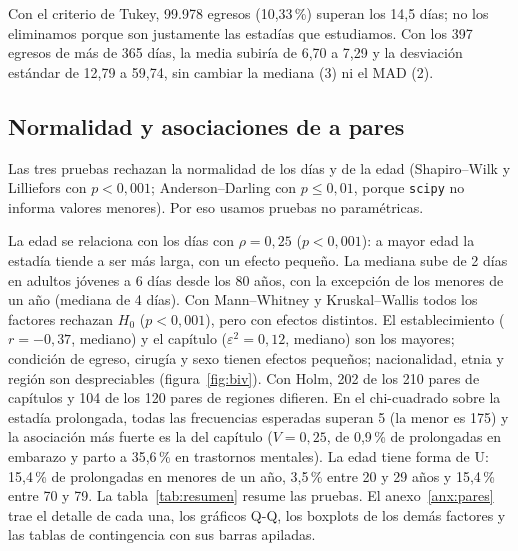 \documentclass[10.5pt,a4paper,headings=small,abstract=false,bibliography=totoc,listof=totoc]{scrartcl}
\newcommand{\pct}{\,\%}
\newcommand{\anexo}[1]{anexo~\ref{#1}}
\begin{document}
Con el criterio de Tukey, 99.978 egresos (10,33\pct{}) superan los 14,5 días; no los eliminamos porque son justamente las estadías que estudiamos. Con los 397 egresos de más de 365 días, la media subiría de 6,70 a 7,29 y la desviación estándar de 12,79 a 59,74, sin cambiar la mediana (3) ni el MAD (2).

\subsection{Normalidad y asociaciones de a pares}

Las tres pruebas rechazan la normalidad de los días y de la edad (Shapiro--Wilk y Lilliefors con $p<0{,}001$; Anderson--Darling con $p\le0{,}01$, porque \texttt{scipy} no informa valores menores). Por eso usamos pruebas no paramétricas.

La edad se relaciona con los días con $\rho=0{,}25$ ($p<0{,}001$): a mayor edad la estadía tiende a ser más larga, con un efecto pequeño. La mediana sube de 2 días en adultos jóvenes a 6 días desde los 80 años, con la excepción de los menores de un año (mediana de 4 días). Con Mann--Whitney y Kruskal--Wallis todos los factores rechazan $H_0$ ($p<0{,}001$), pero con efectos distintos. El establecimiento ($r=-0{,}37$, mediano) y el capítulo ($\varepsilon^2=0{,}12$, mediano) son los mayores; condición de egreso, cirugía y sexo tienen efectos pequeños; nacionalidad, etnia y región son despreciables (figura~\ref{fig:biv}). Con Holm, 202 de los 210 pares de capítulos y 104 de los 120 pares de regiones difieren. En el chi-cuadrado sobre la estadía prolongada, todas las frecuencias esperadas superan 5 (la menor es 175) y la asociación más fuerte es la del capítulo ($V=0{,}25$, de 0,9\pct{} de prolongadas en embarazo y parto a 35,6\pct{} en trastornos mentales). La edad tiene forma de U: 15,4\pct{} de prolongadas en menores de un año, 3,5\pct{} entre 20 y 29 años y 15,4\pct{} entre 70 y 79. La tabla~\ref{tab:resumen} resume las pruebas. El \anexo{anx:pares} trae el detalle de cada una, los gráficos Q-Q, los boxplots de los demás factores y las tablas de contingencia con sus barras apiladas.
\end{document}
